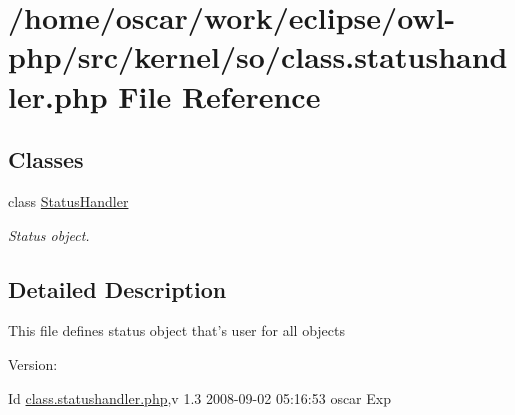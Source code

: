 \hypertarget{class_8statushandler_8php}{
\section{/home/oscar/work/eclipse/owl-php/src/kernel/so/class.statushandler.php File Reference}
\label{class_8statushandler_8php}
}
\subsection*{Classes}
\begin{CompactItemize}
\item 
class \hyperlink{classStatusHandler}{StatusHandler}
\begin{CompactList}\small\item\em Status object. \item\end{CompactList}\end{CompactItemize}


\subsection{Detailed Description}
This file defines status object that's user for all objects \begin{Desc}
\item[Version:]\end{Desc}
\begin{Desc}
\item[Id]\hyperlink{class_8statushandler_8php}{class.statushandler.php},v 1.3 2008-09-02 05:16:53 oscar Exp \end{Desc}
